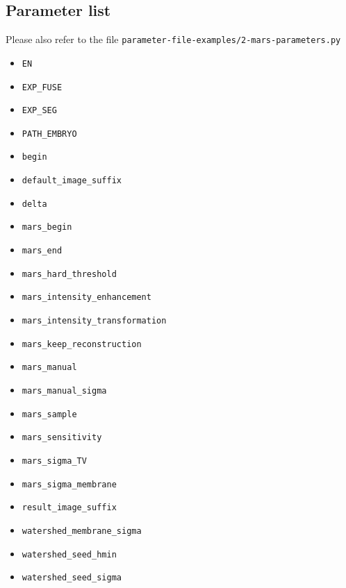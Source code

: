 \subsection{Parameter list}

Please also refer to the file
\texttt{parameter-file-examples/2-mars-parameters.py}

\begin{itemize}
\itemsep -1ex
\item \texttt{EN}
\item \texttt{EXP\_FUSE}
\item \texttt{EXP\_SEG}
\item \texttt{PATH\_EMBRYO}
\item \texttt{begin}
\item \texttt{default\_image\_suffix}
\item \texttt{delta}
\item \texttt{mars\_begin}
\item \texttt{mars\_end}
\item \texttt{mars\_hard\_threshold}
\item \texttt{mars\_intensity\_enhancement}
\item \texttt{mars\_intensity\_transformation}
\item \texttt{mars\_keep\_reconstruction}
\item \texttt{mars\_manual}
\item \texttt{mars\_manual\_sigma}
\item \texttt{mars\_sample}
\item \texttt{mars\_sensitivity}
\item \texttt{mars\_sigma\_TV}
\item \texttt{mars\_sigma\_membrane}
\item \texttt{result\_image\_suffix}
\item \texttt{watershed\_membrane\_sigma}
\item \texttt{watershed\_seed\_hmin}
\item \texttt{watershed\_seed\_sigma}
\end{itemize}